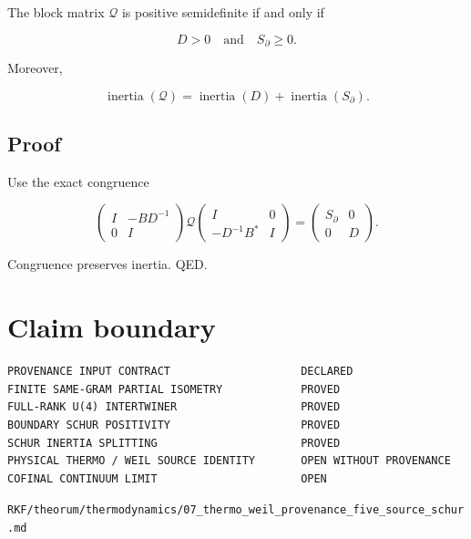 The block matrix \(\mathcal Q\) is positive semidefinite if and only if

\[
D>0
\quad\text{and}\quad
S_\partial\ge0.
\]

Moreover,

\[
\operatorname{inertia}(\mathcal Q)
=
\operatorname{inertia}(D)
+
\operatorname{inertia}(S_\partial).
\]

\hypertarget{proof-1}{%
\subsection{Proof}\label{proof-1}}

Use the exact congruence

\[
\begin{pmatrix}I&-BD^{-1}\\0&I\end{pmatrix}
\mathcal Q
\begin{pmatrix}I&0\\-D^{-1}B^*&I\end{pmatrix}
=
\begin{pmatrix}S_\partial&0\\0&D\end{pmatrix}.
\]

Congruence preserves inertia. QED.

\hypertarget{claim-boundary}{%
\section{Claim boundary}\label{claim-boundary}}

\begin{verbatim}
PROVENANCE INPUT CONTRACT                    DECLARED
FINITE SAME-GRAM PARTIAL ISOMETRY            PROVED
FULL-RANK U(4) INTERTWINER                   PROVED
BOUNDARY SCHUR POSITIVITY                    PROVED
SCHUR INERTIA SPLITTING                      PROVED
PHYSICAL THERMO / WEIL SOURCE IDENTITY       OPEN WITHOUT PROVENANCE
COFINAL CONTINUUM LIMIT                      OPEN
\end{verbatim}

\begin{flushright}\small\texttt{RKF/theorum/thermodynamics/07\_thermo\_weil\_provenance\_five\_source\_schur.md}\end{flushright}
